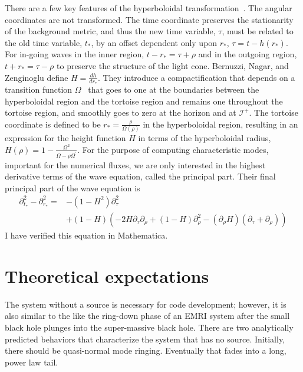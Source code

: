 There are a few key features of the hyperboloidal transformation~\cite{bernuzzi_nagar_zenginoglu_hyperb}. The angular coordinates are not transformed. The time coordinate preserves the stationarity of the background metric, and thus the new time variable, $\tau$, must be related to the old time variable, $t_*$, by an offset dependent only upon $r_*$, $\tau=t-h(r_*)$. For in-going waves in the inner region, $t-r_*=\tau+\rho$ and in the outgoing region, $t+r_*=\tau-\rho$ to preserve the structure of the light cone. Bernuzzi, Nagar, and Zenginoglu define $H=\frac{dh}{dr_*}$. They introduce a compactification that depends on a transition function $\Omega$~\cite{OmegaTransferFunction} that goes to one at the boundaries between the hyperboloidal region and the tortoise region and remains one throughout the tortoise region, and smoothly goes to zero at the horizon and at $\mathcal{I}^+$. The tortoise coordinate is defined to be  $r_*=\frac{\rho}{\Omega(\rho)}$ in the hyperboloidal region, resulting in an expression for the height function $H$ in terms of the hyperboloidal radius,  $H(\rho)=1-\frac{\Omega^2}{\Omega-\rho\Omega^\prime}$. For the purpose of computing characteristic modes, important for the numerical fluxes, we are only interested in the highest derivative terms of the wave equation, called the principal part. Their final principal part of the wave equation is~\cite{bernuzzi_nagar_zenginoglu_hyperb}
  \begin{eqnarray}
    \partial_{t_*}^2-\partial_{r_*}^2=&-(1-H^2)\partial_\tau^2\nonumber\\
    &+(1-H)(-2H\partial_\tau\partial_\rho+(1-H)\partial_\rho^2-(\partial_\rho H)(\partial_\tau+\partial_\rho))
  \end{eqnarray}    
I have verified this equation in Mathematica.

  



\section{Theoretical expectations}

The system without a source is necessary for code development; however, it is also similar to the like the ring-down phase of an EMRI system after the small black hole plunges into the super-massive black hole. There are two analytically predicted behaviors that characterize the system that has no source. Initially, there should be quasi-normal mode ringing. Eventually that fades into a long, power law tail. 

